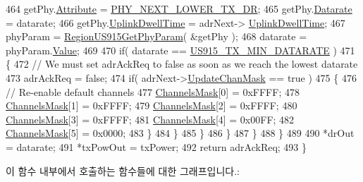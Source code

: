 \begin{DoxyCode}
464                     getPhy.\mbox{\hyperlink{structs_get_phy_params_abdcb168ffd6913b85e2f635d7a475f2d}{Attribute}} = \mbox{\hyperlink{group___r_e_g_i_o_n_gga51cbe8f5433d914fe9cf81b451de2c2dac002e7e492cf30dbf9c544b062f5cc8a}{PHY\_NEXT\_LOWER\_TX\_DR}};
465                     getPhy.\mbox{\hyperlink{structs_get_phy_params_ae2f6080f3aa0e9485c55513ca56bb24d}{Datarate}} = datarate;
466                     getPhy.\mbox{\hyperlink{structs_get_phy_params_a0e6663762d6f9173bc8d8cb018f8f17a}{UplinkDwellTime}} = adrNext->
      \mbox{\hyperlink{structs_adr_next_params_a0e6663762d6f9173bc8d8cb018f8f17a}{UplinkDwellTime}};
467                     phyParam = \mbox{\hyperlink{group___r_e_g_i_o_n_u_s915_ga644569c2f1367a399ff93a81f160a7d9}{RegionUS915GetPhyParam}}( &getPhy );
468                     datarate = phyParam.\mbox{\hyperlink{unionu_phy_param_a8e0dcce3428a8051614e852b8836d0d1}{Value}};
469 
470                     \textcolor{keywordflow}{if}( datarate == \mbox{\hyperlink{group___r_e_g_i_o_n_u_s915_ga82ad1f3ace520fc55727e442784bdcb6}{US915\_TX\_MIN\_DATARATE}} )
471                     \{
472                         \textcolor{comment}{// We must set adrAckReq to false as soon as we reach the lowest datarate}
473                         adrAckReq = \textcolor{keyword}{false};
474                         \textcolor{keywordflow}{if}( adrNext->\mbox{\hyperlink{structs_adr_next_params_a708080da9c63d868556b2c48cb53003b}{UpdateChanMask}} == \textcolor{keyword}{true} )
475                         \{
476                             \textcolor{comment}{// Re-enable default channels}
477                             \mbox{\hyperlink{_region_u_s915_8c_a2188957b5ca6af8092154d7ccbfa5757}{ChannelsMask}}[0] = 0xFFFF;
478                             \mbox{\hyperlink{_region_u_s915_8c_a2188957b5ca6af8092154d7ccbfa5757}{ChannelsMask}}[1] = 0xFFFF;
479                             \mbox{\hyperlink{_region_u_s915_8c_a2188957b5ca6af8092154d7ccbfa5757}{ChannelsMask}}[2] = 0xFFFF;
480                             \mbox{\hyperlink{_region_u_s915_8c_a2188957b5ca6af8092154d7ccbfa5757}{ChannelsMask}}[3] = 0xFFFF;
481                             \mbox{\hyperlink{_region_u_s915_8c_a2188957b5ca6af8092154d7ccbfa5757}{ChannelsMask}}[4] = 0x00FF;
482                             \mbox{\hyperlink{_region_u_s915_8c_a2188957b5ca6af8092154d7ccbfa5757}{ChannelsMask}}[5] = 0x0000;
483                         \}
484                     \}
485                 \}
486             \}
487         \}
488     \}
489 
490     *drOut = datarate;
491     *txPowOut = txPower;
492     \textcolor{keywordflow}{return} adrAckReq;
493 \}
\end{DoxyCode}
이 함수 내부에서 호출하는 함수들에 대한 그래프입니다.\+:
\mbox{\label{group___r_e_g_i_o_n_u_s915_gad0a015a1b8157a3806d982cbf7249720}} 
